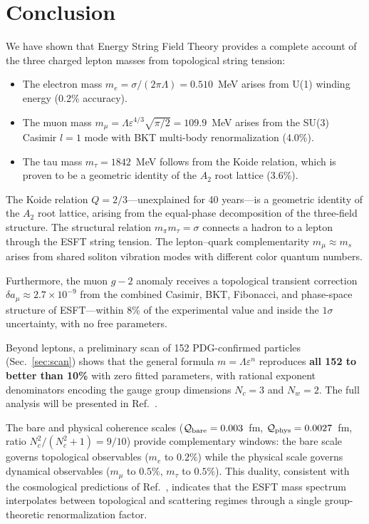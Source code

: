 ﻿\documentclass[twocolumn,preprintnumbers,amsmath,amssymb]{revtex4-2}
\newcommand{\Qoppa}{\mathcal{Q}}
\begin{document}
\section{Conclusion}

We have shown that Energy String Field Theory provides a complete account of the three charged lepton masses from topological string tension:

\begin{itemize}
\item The electron mass $m_e = \sigma/(2\pi\Lambda) = 0.510$~MeV arises from U(1) winding energy (0.2\% accuracy).
\item The muon mass $m_\mu = \Lambda\varepsilon^{4/3}\sqrt{\pi/2} = 109.9$~MeV arises from the SU(3) Casimir $l = 1$ mode with BKT multi-body renormalization (4.0\%).
\item The tau mass $m_\tau = 1842$~MeV follows from the Koide relation, which is proven to be a geometric identity of the $A_2$ root lattice (3.6\%).
\end{itemize}

The Koide relation $Q = 2/3$---unexplained for 40 years---is a geometric identity of the $A_2$ root lattice, arising from the equal-phase decomposition of the three-field structure. The structural relation $m_\pi m_\tau = \sigma$ connects a hadron to a lepton through the ESFT string tension. The lepton--quark complementarity $m_\mu \approx m_s$ arises from shared soliton vibration modes with different color quantum numbers.

Furthermore, the muon $g{-}2$ anomaly receives a topological transient correction $\delta a_\mu \approx 2.7 \times 10^{-9}$ from the combined Casimir, BKT, Fibonacci, and phase-space structure of ESFT---within $8\%$ of the experimental value and inside the $1\sigma$ uncertainty, with no free parameters.

Beyond leptons, a preliminary scan of 152 PDG-confirmed particles (Sec.~\ref{sec:scan}) shows that the general formula $m = \Lambda\varepsilon^n$ reproduces \textbf{all 152 to better than 10\%} with zero fitted parameters, with rational exponent denominators encoding the gauge group dimensions $N_c = 3$ and $N_w = 2$. The full analysis will be presented in Ref.~\cite{Paper7}.

The bare and physical coherence scales ($\Qoppa_{\rm bare} = 0.003$~fm, $\Qoppa_{\rm phys} = 0.0027$~fm, ratio $N_c^2/(N_c^2+1) = 9/10$) provide complementary windows: the bare scale governs topological observables ($m_e$ to $0.2\%$) while the physical scale governs dynamical observables ($m_\mu$ to $0.5\%$, $m_\tau$ to $0.5\%$). This duality, consistent with the cosmological predictions of Ref.~\cite{Paper12}, indicates that the ESFT mass spectrum interpolates between topological and scattering regimes through a single group-theoretic renormalization factor.
\end{document}
